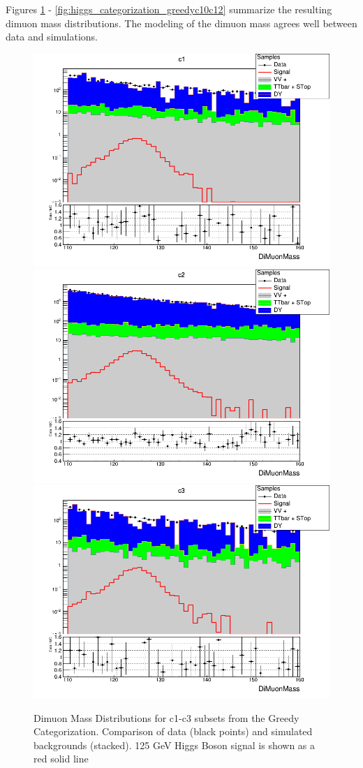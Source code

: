 Figures \ref{fig:higgs_categorization_greedyc1c3} - \ref{fig:higgs_categorization_greedyc10c12} summarize the resulting dimuon mass distributions. The modeling of the dimuon mass agrees well between data and simulations.
\begin{figure}[htbp]
  \centering
  \includegraphics[width=0.65\linewidth]{figures/ch_higgs/distributions/bdt_uf/distribution__c1__DiMuonMass__logY.png}\\
  \includegraphics[width=0.65\linewidth]{figures/ch_higgs/distributions/bdt_uf/distribution__c2__DiMuonMass__logY.png}\\
  \includegraphics[width=0.65\linewidth]{figures/ch_higgs/distributions/bdt_uf/distribution__c3__DiMuonMass__logY.png}
  \caption{Dimuon Mass Distributions for c1-c3 subsets from the Greedy Categorization. Comparison of data (black points) and simulated backgrounds (stacked). 125 GeV Higgs Boson signal is shown as a red solid line}
  \label{fig:higgs_categorization_greedyc1c3}
\end{figure}
